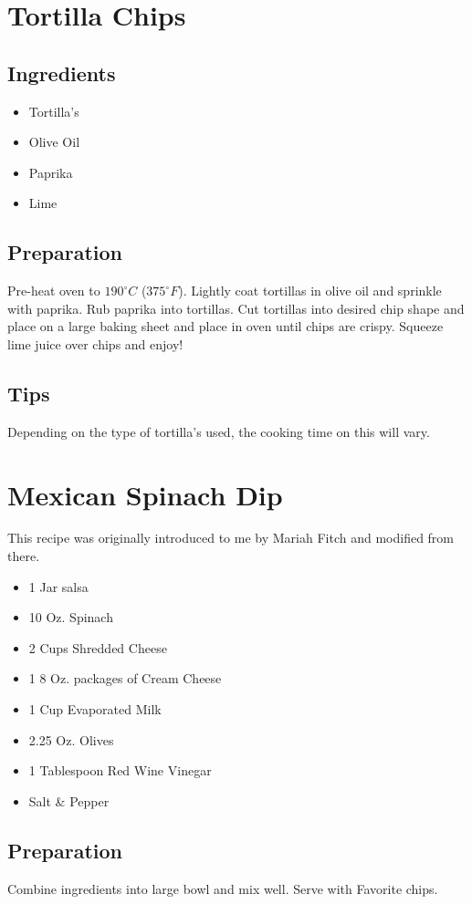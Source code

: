 \thispagestyle{fancy}
\section{Tortilla Chips}
\AddToShipoutPicture*{\TortillaChips}

\subsection*{Ingredients}
\begin{multicols}{3}
	\begin{itemize}
		\item Tortilla's
		\item Olive Oil
		\item Paprika
		\item Lime
	\end{itemize}
\end{multicols}

\subsection*{Preparation}

Pre-heat oven to $190^\circ C$ ($375^\circ F$). Lightly coat tortillas in olive oil and sprinkle with paprika. Rub paprika into tortillas. Cut tortillas into desired chip shape and place on a large baking sheet and place in oven until chips are crispy. Squeeze lime juice over chips and enjoy!

\subsection*{Tips}

Depending on the type of tortilla's used, the cooking time on this will vary.
\vspace{2cm}
\section{Mexican Spinach Dip}

This recipe was originally introduced to me by Mariah Fitch and modified from there.

\begin{multicols}{3}
	\begin{itemize}
		\item 1 Jar salsa
		\item 10 Oz. Spinach
		\item 2 Cups Shredded Cheese
		\item 1 8 Oz. packages of Cream Cheese
		\item 1 Cup Evaporated Milk
		\item 2.25 Oz. Olives
		\item 1 Tablespoon Red Wine Vinegar
		\item Salt \& Pepper
	\end{itemize}
\end{multicols}

\subsection*{Preparation}

Combine ingredients into large bowl and mix well. Serve with Favorite chips.